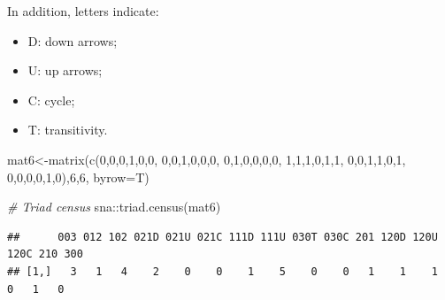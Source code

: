 \documentclass[
  notitlepage,
  onecolumn,
  openany]{book}
\newenvironment{Shaded}{\begin{snugshade}}{\end{snugshade}}
\newcommand{\AttributeTok}[1]{\textcolor[rgb]{0.77,0.63,0.00}{#1}}
\newcommand{\CommentTok}[1]{\textcolor[rgb]{0.56,0.35,0.01}{\textit{#1}}}
\newcommand{\DecValTok}[1]{\textcolor[rgb]{0.00,0.00,0.81}{#1}}
\newcommand{\FunctionTok}[1]{\textcolor[rgb]{0.00,0.00,0.00}{#1}}
\newcommand{\NormalTok}[1]{#1}
\newcommand{\OtherTok}[1]{\textcolor[rgb]{0.56,0.35,0.01}{#1}}
\newcommand{\SpecialCharTok}[1]{\textcolor[rgb]{0.00,0.00,0.00}{#1}}
\begin{document}
In addition, letters indicate:

\begin{itemize}
\item
  D: down arrows;
\item
  U: up arrows;
\item
  C: cycle;
\item
  T: transitivity.
\end{itemize}

\begin{Shaded}
\begin{Highlighting}[]
\NormalTok{mat6}\OtherTok{\textless{}{-}}\FunctionTok{matrix}\NormalTok{(}\FunctionTok{c}\NormalTok{(}\DecValTok{0}\NormalTok{,}\DecValTok{0}\NormalTok{,}\DecValTok{0}\NormalTok{,}\DecValTok{1}\NormalTok{,}\DecValTok{0}\NormalTok{,}\DecValTok{0}\NormalTok{,}
               \DecValTok{0}\NormalTok{,}\DecValTok{0}\NormalTok{,}\DecValTok{1}\NormalTok{,}\DecValTok{0}\NormalTok{,}\DecValTok{0}\NormalTok{,}\DecValTok{0}\NormalTok{,}
               \DecValTok{0}\NormalTok{,}\DecValTok{1}\NormalTok{,}\DecValTok{0}\NormalTok{,}\DecValTok{0}\NormalTok{,}\DecValTok{0}\NormalTok{,}\DecValTok{0}\NormalTok{,}
               \DecValTok{1}\NormalTok{,}\DecValTok{1}\NormalTok{,}\DecValTok{1}\NormalTok{,}\DecValTok{0}\NormalTok{,}\DecValTok{1}\NormalTok{,}\DecValTok{1}\NormalTok{,}
               \DecValTok{0}\NormalTok{,}\DecValTok{0}\NormalTok{,}\DecValTok{1}\NormalTok{,}\DecValTok{1}\NormalTok{,}\DecValTok{0}\NormalTok{,}\DecValTok{1}\NormalTok{,}
               \DecValTok{0}\NormalTok{,}\DecValTok{0}\NormalTok{,}\DecValTok{0}\NormalTok{,}\DecValTok{0}\NormalTok{,}\DecValTok{1}\NormalTok{,}\DecValTok{0}\NormalTok{),}\DecValTok{6}\NormalTok{,}\DecValTok{6}\NormalTok{, }\AttributeTok{byrow=}\NormalTok{T)}

\CommentTok{\# Triad census}
\NormalTok{sna}\SpecialCharTok{::}\FunctionTok{triad.census}\NormalTok{(mat6)}
\end{Highlighting}
\end{Shaded}

\begin{verbatim}
##      003 012 102 021D 021U 021C 111D 111U 030T 030C 201 120D 120U 120C 210 300
## [1,]   3   1   4    2    0    0    1    5    0    0   1    1    1    0   1   0
\end{verbatim}
\end{document}

